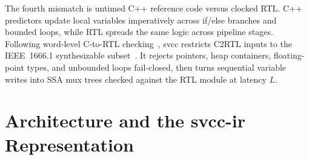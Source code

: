 \documentclass[conference]{IEEEtran}
\newcommand{\code}[1]{{\fontshape{n}\ttfamily #1}}
\begin{document}
The fourth mismatch is untimed C++ reference code versus clocked RTL. C++ predictors update local variables imperatively across \code{if}/\code{else} branches and bounded loops, while RTL spreads the same logic across pipeline stages. Following word-level C-to-RTL checking~\cite{koelbl2009c2rtl}, \code{svcc} restricts \code{C2RTL} inputs to the IEEE~1666.1 synthesizable subset~\cite{ieee1666_1_2016}. It rejects pointers, heap containers, floating-point types, and unbounded loops fail-closed, then turns sequential variable writes into SSA mux trees checked against the RTL module at latency $L$.

\section{Architecture and the svcc-ir Representation}
\label{sec:arch}
\end{document}
